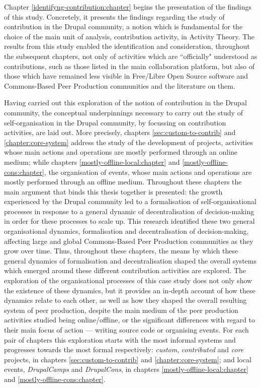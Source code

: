 Chapter \ref{identifyng-contribution:chapter} begins the presentation of the findings of this study. Concretely, it presents the findings regarding the study of contribution in the Drupal community, a notion which is fundamental for the choice of the main unit of analysis, contribution activity, in Activity Theory. The results from this study enabled the identification and consideration, throughout the subsequent chapters, not only of activities which are ``officially" understood as contributions, such as those listed in the main collaboration platform, but also of those which have remained less visible in Free/Libre Open Source software and Commons-Based Peer Production communities and the literature on them.

Having carried out this exploration of the notion of contribution in the Drupal community, the conceptual underpinnings necessary to carry out the study of self-organisation in the Drupal community, by focussing on contribution activities, are laid out. More precisely, chapters \ref{sec:custom-to-contrib} and \ref{chapter:core-system} address the study of the development of projects, activities whose main actions and operations are mostly performed through an online medium;  while chapters \ref{mostly-offline-local:chapter} and \ref{mostly-offline-cons:chapter}, the organisation of events, whose main actions and operations are mostly performed through an offline medium. Throughout these chapters the main argument that binds this thesis together is presented: the growth experienced by the Drupal community led to a formalisation of self-organisational processes in response to a general dynamic of decentralisation of decision-making in order for these processes to scale up. This research identified these two general organisational dynamics, formalisation and decentralisation of decision-making, affecting large and global Commons-Based Peer Production communities as they grow over time. Thus, throughout these chapters, the means by which these general dynamics of formalisation and decentralisation shaped the overall systems which emerged around these different contribution activities are explored. The exploration of the organisational processes of this case study does not only show the existence of these dynamics, but it provides an in-depth account of how these dynamics relate to each other, as well as how they shaped the overall resulting system of peer production, despite the main medium of the peer production activities studied being online/offline, or the significant differences with regard to their main focus of action --- writing source code or organising events. For each pair of chapters this exploration starts with the most informal systems and progresses towards the most formal respectively: \textit{custom}, \textit{contributed} and \textit{core} projects, in chapters \ref{sec:custom-to-contrib} and \ref{chapter:core-system}; and local events, \textit{DrupalCamps} and \textit{DrupalCons}, in chapters \ref{mostly-offline-local:chapter} and \ref{mostly-offline-cons:chapter}.

